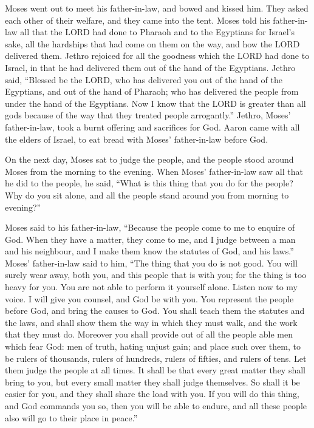  Moses went out to meet his father-in-law, and bowed and
kissed him. They asked each other of their welfare, and they came into
the tent.  Moses told his father-in-law all that the LORD
had done to Pharaoh and to the Egyptians for Israel's sake, all the
hardships that had come on them on the way, and how the LORD delivered
them.  Jethro rejoiced for all the goodness which the LORD
had done to Israel, in that he had delivered them out of the hand of the
Egyptians.  Jethro said, ``Blessed be the LORD, who has
delivered you out of the hand of the Egyptians, and out of the hand of
Pharaoh; who has delivered the people from under the hand of the
Egyptians.  Now I know that the LORD is greater than all
gods because of the way that they treated people arrogantly.''
 Jethro, Moses' father-in-law, took a burnt offering and
sacrifices for God. Aaron came with all the elders of Israel, to eat
bread with Moses' father-in-law before God.

 On the next day, Moses sat to judge the people, and the
people stood around Moses from the morning to the evening. 
When Moses' father-in-law saw all that he did to the people, he said,
``What is this thing that you do for the people? Why do you sit alone,
and all the people stand around you from morning to evening?''

 Moses said to his father-in-law, ``Because the people come
to me to enquire of God.  When they have a matter, they
come to me, and I judge between a man and his neighbour, and I make them
know the statutes of God, and his laws.''  Moses'
father-in-law said to him, ``The thing that you do is not good.
 You will surely wear away, both you, and this people that
is with you; for the thing is too heavy for you. You are not able to
perform it yourself alone.  Listen now to my voice. I will
give you counsel, and God be with you. You represent the people before
God, and bring the causes to God.  You shall teach them the
statutes and the laws, and shall show them the way in which they must
walk, and the work that they must do.  Moreover you shall
provide out of all the people able men which fear God: men of truth,
hating unjust gain; and place such over them, to be rulers of thousands,
rulers of hundreds, rulers of fifties, and rulers of tens. 
Let them judge the people at all times. It shall be that every great
matter they shall bring to you, but every small matter they shall judge
themselves. So shall it be easier for you, and they shall share the load
with you.  If you will do this thing, and God commands you
so, then you will be able to endure, and all these people also will go
to their place in peace.''

